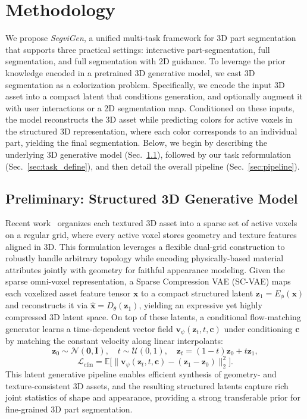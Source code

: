 \section{Methodology}

We propose \textit{SegviGen}, a unified multi-task framework for 3D part segmentation that supports three practical settings: interactive part-segmentation, full segmentation, and full segmentation with 2D guidance.
%
To leverage the prior knowledge encoded in a pretrained 3D generative model, we cast 3D segmentation as a colorization problem.
%
Specifically, we encode the input 3D asset into a compact latent that conditions generation, and optionally augment it with user interactions or a 2D segmentation map.
%
Conditioned on these inputs, the model reconstructs the 3D asset while predicting colors for active voxels in the structured 3D representation, where each color corresponds to an individual part, yielding the final segmentation.
%
Below, we begin by describing the underlying 3D generative model (Sec.~\ref{sec:3d_generative_model}), followed by our task reformulation (Sec.~\ref{sec:task_define}), and then detail the overall pipeline (Sec.~\ref{sec:pipeline}).


\subsection{Preliminary: Structured 3D Generative Model}
\label{sec:3d_generative_model}

Recent work~\cite{trellis2} organizes each textured 3D asset into a sparse set of active voxels on a regular grid, where every active voxel stores geometry and texture features aligned in 3D.
This formulation leverages a flexible dual-grid construction to robustly handle arbitrary topology while encoding physically-based material attributes jointly with geometry for faithful appearance modeling.
%
Given the sparse omni-voxel representation, a Sparse Compression VAE (SC-VAE) maps each voxelized asset feature tensor $\mathbf{x}$ to a compact structured latent $\mathbf{z}_1=E_{\phi}(\mathbf{x})$ and reconstructs it via $\hat{\mathbf{x}}=D_{\theta}(\mathbf{z}_1)$, yielding an expressive yet highly compressed 3D latent space.
%
On top of these latents, a conditional flow-matching generator learns a time-dependent vector field $\mathbf{v}_{\psi}(\mathbf{z}_t,t,\mathbf{c})$ under conditioning $\mathbf{c}$ by matching the constant velocity along linear interpolants:
\begin{equation}
\mathbf{z}_0\sim\mathcal{N}(\mathbf{0},\mathbf{I}),\quad t\sim\mathcal{U}(0,1),\quad \mathbf{z}_t=(1-t)\mathbf{z}_0+t\mathbf{z}_1,
\end{equation}
\begin{equation}
\mathcal{L}_{\mathrm{cfm}}
=\mathbb{E}\Big[\big\|\mathbf{v}_{\psi}(\mathbf{z}_t,t,\mathbf{c})-(\mathbf{z}_1-\mathbf{z}_0)\big\|_2^2\Big].
\end{equation}
%
This latent generative pipeline enables efficient synthesis of geometry- and texture-consistent 3D assets, 
and the resulting structured latents capture rich joint statistics of shape and appearance, providing a strong transferable prior for fine-grained 3D part segmentation.


